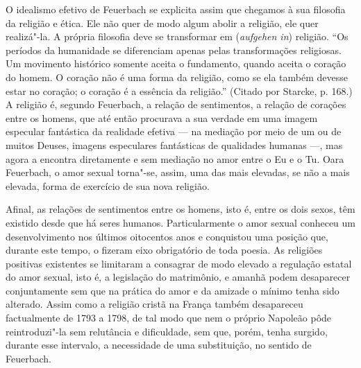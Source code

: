 O idealismo efetivo
de Feuerbach se
explicita assim que chegamos à sua filosofia da religião e ética. Ele
não quer de modo algum abolir a religião, ele quer realizá"-la. A própria
filosofia deve se transformar em (\emph{aufgehen in}) religião. ``Os
períodos da humanidade se diferenciam apenas pelas transformações
religiosas. Um movimento histórico somente aceita o fundamento, quando
aceita o coração do homem. O coração não é uma forma da religião, como
se ela também devesse estar no coração; o coração é a essência da
religião.'' (Citado por Starcke, p. 168.) A religião é,
segundo Feuerbach,
a relação de sentimentos, a relação de corações entre os homens, que até
então procurava a sua verdade em uma imagem especular fantástica da
realidade efetiva --- na mediação por meio de um ou de muitos Deuses,
imagens especulares fantásticas de qualidades humanas ---, mas agora a
encontra diretamente e sem mediação no amor entre o Eu e o Tu.
Oara Feuerbach,
o amor sexual torna"-se, assim, uma das mais elevadas, se não a mais
elevada, forma de exercício de sua nova religião.

Afinal, as relações de sentimentos entre os homens, isto é, entre os
dois sexos, têm existido desde que há seres humanos. Particularmente o
amor sexual conheceu um desenvolvimento nos últimos oitocentos anos e
conquistou uma posição que, durante este tempo, o fizeram eixo
obrigatório de toda poesia. As religiões positivas existentes se
limitaram a consagrar de modo elevado a regulação estatal do amor
sexual, isto é, a legislação do matrimônio, e amanhã podem desaparecer
conjuntamente sem que na prática do amor e da amizade o mínimo tenha
sido alterado. Assim como a religião cristã na França também desapareceu
factualmente de 1793 a 1798, de tal modo que nem o próprio Napoleão pôde
reintroduzi"-la sem relutância e dificuldade, sem que, porém, tenha
surgido, durante esse intervalo, a necessidade de uma substituição, no
sentido
de Feuerbach.

